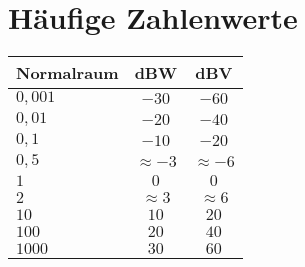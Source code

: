 \section{Häufige Zahlenwerte}

\begin{table}[!htb]
    \centering
    \begin{tabular}{|l|c|c|}
        \hline
        \textbf{Normalraum} & \textbf{dBW}  & \textbf{dBV}  \\ \hline
        $0,001$             & $-30$         & $-60$         \\
        $0,01$              & $-20$         & $-40$         \\
        $0,1$               & $-10$         & $-20$         \\
        $0,5$               & $\approx-3$   & $\approx-6$   \\
        $1$                 & $0$           & $0$           \\
        $2$                 & $\approx 3$   & $\approx 6$   \\
        $10$                & $10$          & $20$          \\
        $100$               & $20$          & $40$          \\
        $1000$              & $30$          & $60$          \\ \hline
    \end{tabular}
\end{table}